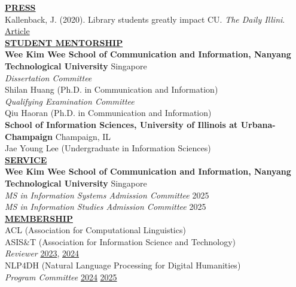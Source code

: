 \documentclass{article}
\begin{document}

\noindent \textbf{\underline{PRESS}} \\
\noindent Kallenback, J. (2020). Library students greatly impact CU. \textit{The Daily Illini}. \hfill \href{https://dailyillini.com/life_and_culture-stories/2020/11/11/library-students-greatly-impact-cu/}{Article} \\


\noindent \textbf{\underline{STUDENT MENTORSHIP}} \\
\noindent \textbf{Wee Kim Wee School of Communication and Information, Nanyang Technological University} \hfill Singapore \\
\noindent \textit{Dissertation Committee} \\
\noindent Shilan Huang (Ph.D. in Communication and Information) \\

\noindent \textit{Qualifying Examination Committee} \\
\noindent Qiu Haoran (Ph.D. in Communication and Information) \\

\noindent \textbf{School of Information Sciences, University of Illinois at Urbana-Champaign} \hfill Champaign, IL \\
\noindent Jae Young Lee (Undergraduate in Information Sciences) \\


\noindent \textbf{\underline{SERVICE}} \\
\noindent \textbf{Wee Kim Wee School of Communication and Information, Nanyang Technological University} \hfill Singapore \\
\noindent \textit{MS in Information Systems Admission Committee} \hfill 2025 \\
\noindent \textit{MS in Information Studies Admission Committee} \hfill 2025 \\


\noindent \textbf{\underline{MEMBERSHIP}} \\ 
\noindent ACL (Association for Computational Linguistics) \\
\noindent ASIS\&T (Association for Information Science and Technology) \\
\textit{Reviewer} \hfill \href{https://www.asist.org/meetings-events/am/am23/2023-annual-meeting-reviewers/}{2023}, \href{https://www.asist.org/meetings-events/am/am24/2024-annual-meeting-reviewers/}{2024}\\
\noindent NLP4DH (Natural Language Processing for Digital Humanities) \\
\textit{Program Committee} \hfill \href{https://www.nlp4dh.com/nlp4dh-2024}{2024} \href{https://www.nlp4dh.com/nlp4dh-2025}{2025} \\
\end{document}
